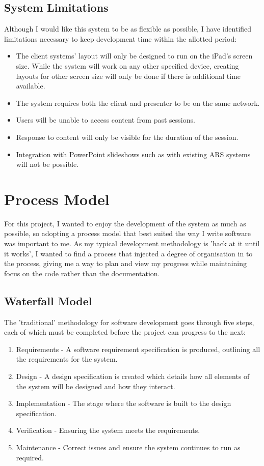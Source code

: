 \documentclass[a4papert,11pt,notitlepage]{ltxdoc}
\begin{document}
\subsection{System Limitations}
Although I would like this system to be as flexible as possible, I have identified limitations necessary to keep development time within the allotted period:
\begin{itemize}
\item The client systems' layout will only be designed to run on the iPad's screen size. While the system will work on any other specified device, creating layouts for other screen size will only be done if there is additional time available.
\item The system requires both the client and presenter to be on the same network.
\item Users will be unable to access content from past sessions.
\item Response to content will only be visible for the duration of the session.
\item Integration with PowerPoint slideshows such as with existing ARS systems will not be possible.
\end{itemize}

\section{Process Model}
For this project, I wanted to enjoy the development of the system as much as possible, so adopting a process model that best suited the way I write software was important to me. As my typical development methodology is 'hack at it until it works', I wanted to find a process that injected a degree of organisation in to the process, giving me a way to plan and view my progress while maintaining focus on the code rather than the documentation.

\subsection{Waterfall Model}
The 'traditional' methodology for software development goes through five steps, each of which must be completed before the project can progress to the next:
\begin{enumerate}
\item Requirements - A software requirement specification is produced, outlining all the requirements for the system.
\item Design - A design specification is created which details how all elements of the system will be designed and how they interact.
\item Implementation - The stage where the software is built to the design specification.
\item Verification - Ensuring the system meets the requirements.
\item Maintenance - Correct issues and ensure the system continues to run as required.
\end{enumerate}
\end{document}
